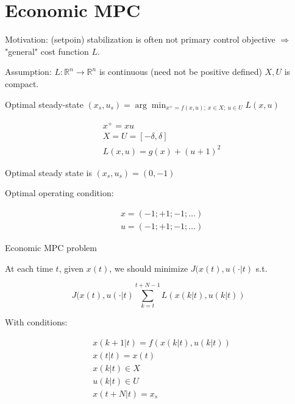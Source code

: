 \section{Economic MPC}

Motivation: (setpoin) stabilization is often not primary control objective 
$\Rightarrow$ "general" cost function $L$.

Assumption: $L:\mathbb{R}^n\rightarrow\mathbb{R}^n$ is continuous (need not
be positive defined) $X,U$ is compact.

\begin{Definition}
 Optimal steady-state $(x_s,u_s)=\arg\min_{x^+=f(x,u);\ x\in X;\ u\in U}L(x,u)$
\end{Definition}

\begin{Example}
 \begin{equation*}
  \begin{split}
   &x^+=xu \\
   &X=U=[-\delta,\delta] \\
   &L(x,u)=g(x)+(u+1)^2
  \end{split}
 \end{equation*}

 Optimal steady state is $(x_s,u_s)=(0,-1)$

 Optimal operating condition:

 \begin{equation*}
  \begin{split}
   &x=(-1;+1;-1;\dots) \\
   &u=(-1;+1;-1;\dots)
  \end{split}
 \end{equation*}
\end{Example}


Economic MPC problem

At each time $t$, given $x(t)$, we should minimize $J(x(t),u(\cdot|t)$ s.t.

$$J(x(t),u(\cdot|t)\sum_{k=t}^{t+N-1}L(x(k|t),u(k|t))$$

With conditions:

\begin{equation*}
 \begin{split}
  &x(k+1|t) = f(x(k|t),u(k|t)) \\
  &x(t|t) = x(t) \\
  &x(k|t)\in X \\
  &u(k|t)\in U \\
  &x(t+N|t) = x_s
 \end{split}
\end{equation*}

